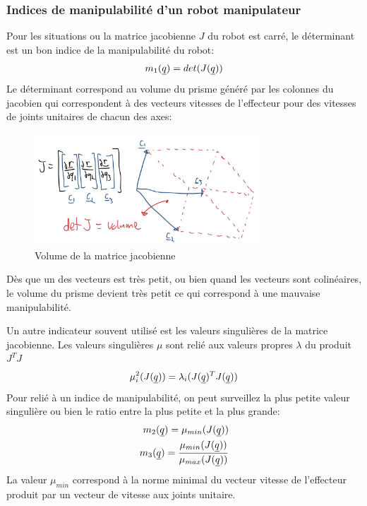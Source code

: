 \subsubsection{Indices de manipulabilité d'un robot manipulateur}

Pour les situations ou la matrice jacobienne $J$ du robot est carré, le déterminant est un bon indice de la manipulabilité du robot:
\begin{align}
m_1(\underline{q})= det( J(\underline{q}) )
\end{align} 
Le déterminant correspond au volume du prisme généré par les colonnes du jacobien qui correspondent à des vecteurs vitesses de l'effecteur pour des vitesses de joints unitaires de chacun des axes:
\begin{figure}[H]
	\centering
		\includegraphics[width=0.75\textwidth]{fig/jacobianvolume.jpg}
	\caption{Volume de la matrice jacobienne}
	\label{fig:jacobianvolume}
\end{figure}
Dès que un des vecteurs est très petit, ou bien quand les vecteurs sont colinéaires, le volume du prisme devient très petit ce qui correspond à une mauvaise manipulabilité.


Un autre indicateur souvent utilisé est les valeurs singulières de la matrice jacobienne. Les valeurs singulières $\mu$ sont relié aux valeurs propres $\lambda$ du produit $J^TJ$
\begin{align}
\mu^2_{i}( J(\underline{q}) ) = \lambda_i( J(\underline{q})^T J(\underline{q}) )
\end{align} 
Pour relié à un indice de manipulabilité, on peut surveillez la plus petite valeur singulière ou bien le ratio entre la plus petite et la plus grande:
\begin{align}
m_2(\underline{q})= \mu_{min}( J(\underline{q}) ) \\
m_3(\underline{q})= \frac{\mu_{min}( J(\underline{q}) ) }{\mu_{max}( J(\underline{q}) ) }\\
\end{align} 
La valeur $\mu_{min}$ correspond à la norme minimal du vecteur vitesse de l'effecteur produit par un vecteur de vitesse aux joints unitaire.


